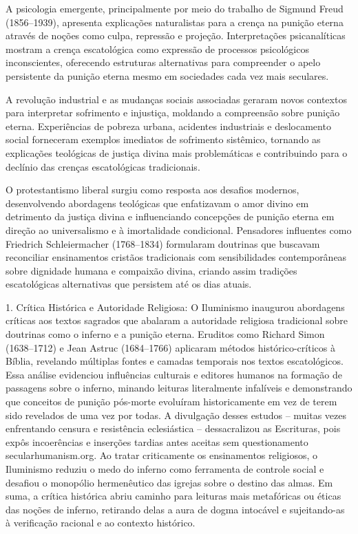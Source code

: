 A psicologia emergente, principalmente por meio do trabalho de Sigmund Freud (1856--1939), apresenta explicações naturalistas para a crença na punição eterna através de noções como culpa, repressão e projeção. Interpretações psicanalíticas mostram a crença escatológica como expressão de processos psicológicos inconscientes, oferecendo estruturas alternativas para compreender o apelo persistente da punição eterna mesmo em sociedades cada vez mais seculares.

A revolução industrial e as mudanças sociais associadas geraram novos contextos para interpretar sofrimento e injustiça, moldando a compreensão sobre punição eterna. Experiências de pobreza urbana, acidentes industriais e deslocamento social forneceram exemplos imediatos de sofrimento sistêmico, tornando as explicações teológicas de justiça divina mais problemáticas e contribuindo para o declínio das crenças escatológicas tradicionais.

O protestantismo liberal surgiu como resposta aos desafios modernos, desenvolvendo abordagens teológicas que enfatizavam o amor divino em detrimento da justiça divina e influenciando concepções de punição eterna em direção ao universalismo e à imortalidade condicional. Pensadores influentes como Friedrich Schleiermacher (1768--1834) formularam doutrinas que buscavam reconciliar ensinamentos cristãos tradicionais com sensibilidades contemporâneas sobre dignidade humana e compaixão divina, criando assim tradições escatológicas alternativas que persistem até os dias atuais.

1. Crítica Histórica e Autoridade Religiosa: O Iluminismo inaugurou abordagens críticas aos textos sagrados que abalaram a autoridade religiosa tradicional sobre doutrinas como o inferno e a punição eterna. Eruditos como Richard Simon (1638--1712) e Jean Astruc (1684--1766) aplicaram métodos histórico-críticos à Bíblia, revelando múltiplas fontes e camadas temporais nos textos escatológicos. Essa análise evidenciou influências culturais e editores humanos na formação de passagens sobre o inferno, minando leituras literalmente infalíveis e demonstrando que conceitos de punição pós-morte evoluíram historicamente em vez de terem sido revelados de uma vez por todas. A divulgação desses estudos -- muitas vezes enfrentando censura e resistência eclesiástica -- dessacralizou as Escrituras, pois expôs incoerências e inserções tardias antes aceitas sem questionamento secularhumanism.org. Ao tratar criticamente os ensinamentos religiosos, o Iluminismo reduziu o medo do inferno como ferramenta de controle social e desafiou o monopólio hermenêutico das igrejas sobre o destino das almas. Em suma, a crítica histórica abriu caminho para leituras mais metafóricas ou éticas das noções de inferno, retirando delas a aura de dogma intocável e sujeitando-as à verificação racional e ao contexto histórico.


